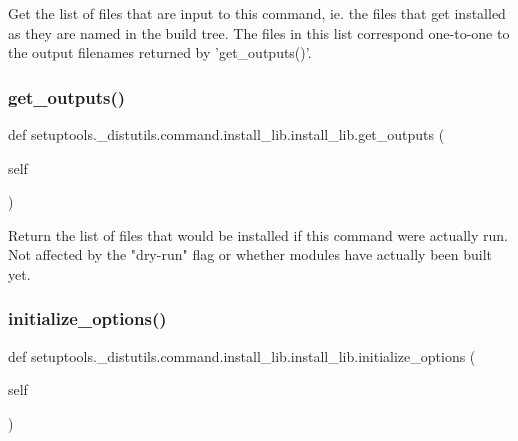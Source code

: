 \begin{DoxyVerb}Get the list of files that are input to this command, ie. the
files that get installed as they are named in the build tree.
The files in this list correspond one-to-one to the output
filenames returned by 'get_outputs()'.
\end{DoxyVerb}
 \mbox{\label{classsetuptools_1_1__distutils_1_1command_1_1install__lib_1_1install__lib_aae96e70e25d56d3535bb67c19cc4413a}} 
\subsubsection{\texorpdfstring{get\+\_\+outputs()}{get\_outputs()}}
{\footnotesize\ttfamily def setuptools.\+\_\+distutils.\+command.\+install\+\_\+lib.\+install\+\_\+lib.\+get\+\_\+outputs (\begin{DoxyParamCaption}\item[{}]{self }\end{DoxyParamCaption})}

\begin{DoxyVerb}Return the list of files that would be installed if this command
were actually run.  Not affected by the "dry-run" flag or whether
modules have actually been built yet.
\end{DoxyVerb}
 \mbox{\label{classsetuptools_1_1__distutils_1_1command_1_1install__lib_1_1install__lib_a27598c070113d4cd3f232564ef297ee1}} 
\subsubsection{\texorpdfstring{initialize\+\_\+options()}{initialize\_options()}}
{\footnotesize\ttfamily def setuptools.\+\_\+distutils.\+command.\+install\+\_\+lib.\+install\+\_\+lib.\+initialize\+\_\+options (\begin{DoxyParamCaption}\item[{}]{self }\end{DoxyParamCaption})}

